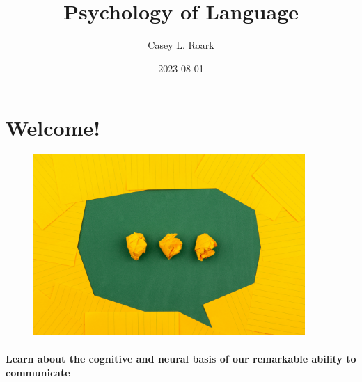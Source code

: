 \documentclass[
  letterpaper,
  DIV=11,
  numbers=noendperiod]{scrreprt}
\title{Psychology of Language}
\author{Casey L. Roark}
\date{2023-08-01}
\renewcommand*\contentsname{Table of contents}
\newcommand\contentsname{Table of contents}
\begin{document}
\maketitle
\ifdefined\Shaded\renewenvironment{Shaded}{\begin{tcolorbox}[enhanced, boxrule=0pt, interior hidden, frame hidden, borderline west={3pt}{0pt}{shadecolor}, breakable, sharp corners]}{\end{tcolorbox}}\fi

\renewcommand*\contentsname{Table of contents}
{
\hypersetup{linkcolor=}
\setcounter{tocdepth}{2}
\tableofcontents
}

\hypertarget{welcome}{%
\chapter*{Welcome!}\label{welcome}}


\begin{figure}

{\centering \includegraphics[width=4.0625in,height=\textheight]{images/volodymyr-hryshchenko-V5vqWC9gyEU-unsplash.jpg}

}

\end{figure}

\hypertarget{learn-about-the-cognitive-and-neural-basis-of-our-remarkable-ability-to-communicate}{%
\subsubsection*{Learn about the cognitive and neural basis of our
remarkable ability to
communicate}\label{learn-about-the-cognitive-and-neural-basis-of-our-remarkable-ability-to-communicate}}
\end{document}
